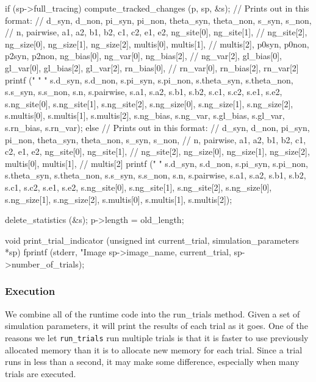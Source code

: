 \documentclass{article}
\begin{document}
\begin{ccode}
{  if (sp->full_tracing) {
    compute_tracked_changes 	(p, sp, &s);
    // Prints out in this format:
    // d_syn, d_non, pi_syn, pi_non, theta_syn, theta_non, s_syn, s_non,
    // n, pairwise, a1, a2, b1, b2, c1, c2, e1, e2, ng_site[0], ng_site[1],
    // ng_site[2], ng_size[0], ng_size[1], ng_size[2], multis[0], multis[1],
    // multis[2], p0syn, p0non, p2syn, p2non, ng_bias[0], ng_var[0], ng_bias[2],
    // ng_var[2], gl_bias[0], gl_var[0], gl_bias[2], gl_var[2], rn_bias[0],
    // rn_var[0], rn_bias[2], rn_var[2]
    printf ("%
	    "%
	    "%
	    s.d_syn, s.d_non, s.pi_syn, s.pi_non, s.theta_syn, s.theta_non,
	    s.s_syn, s.s_non, s.n, s.pairwise, s.a1, s.a2, s.b1, s.b2, s.c1,
	    s.c2, s.e1, s.e2, s.ng_site[0], s.ng_site[1], s.ng_site[2],
	    s.ng_size[0], s.ng_size[1], s.ng_size[2], s.multis[0], s.multis[1],
	    s.multis[2], s.ng_bias, s.ng_var, s.gl_bias, s.gl_var, s.rn_bias,
	    s.rn_var);
  } else {
    // Prints out in this format:
    // d_syn, d_non, pi_syn, pi_non, theta_syn, theta_non, s_syn, s_non,
    // n, pairwise, a1, a2, b1, b2, c1, c2, e1, e2, ng_site[0], ng_site[1],
    // ng_site[2], ng_size[0], ng_size[1], ng_size[2], multis[0], multis[1],
    // multis[2]
    printf ("%
	    "%
	    s.d_syn, s.d_non, s.pi_syn, s.pi_non, s.theta_syn, s.theta_non,
	    s.s_syn, s.s_non, s.n, s.pairwise, s.a1, s.a2, s.b1, s.b2, s.c1,
	    s.c2, s.e1, s.e2, s.ng_site[0], s.ng_site[1], s.ng_site[2],
	    s.ng_size[0], s.ng_size[1], s.ng_size[2], s.multis[0], s.multis[1],
	    s.multis[2]);
  }

  delete_statistics (&s);
  p->length = old_length;
}

void print_trial_indicator (unsigned int current_trial, simulation_parameters *sp) {
  fprintf (stderr, "Image %
         sp->image_name, current_trial, sp->number_of_trials);
}
\end{ccode}

      \subsubsection{Execution}

	We combine all of the runtime code into the run_trials method. Given a
	set of simulation parameters, it will print the results of each trial as
	it goes. One of the reasons we let \verb|run_trials| run multiple trials
	is that it is faster to use previously allocated memory than it is to
	allocate new memory for each trial. Since a trial runs in less than a
	second, it may make some difference, especially when many trials are
	executed.
\end{document}
